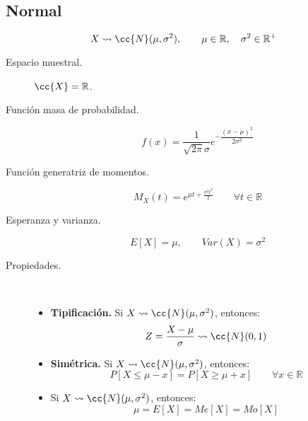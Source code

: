\subsection{Normal}
\begin{equation*}
    X\rightsquigarrow\cc{N}(\mu, \sigma^2), \qquad \mu\in \mathbb{R}, \quad \sigma^2 \in \mathbb{R}^+
\end{equation*}
\begin{description}
    \item [Espacio muestral.] $\cc{X}=\mathbb{R}$.
    \item [Función masa de probabilidad.] 
        \begin{equation*}
            f(x) = \dfrac{1}{\sqrt{2\pi}\sigma} e^{-\dfrac{{(x-\mu)}^{2}}{2\sigma^2}}
        \end{equation*}
    \item [Función generatriz de momentos.] 
        \begin{equation*}
            M_X(t) = e^{\mu t + \frac{\sigma^2t^2}{2}}\qquad \forall t\in \mathbb{R}
        \end{equation*}
    \item [Esperanza y varianza.] 
        \begin{equation*}
            E[X] = \mu, \qquad Var(X) = \sigma^2
        \end{equation*}
    \item [Propiedades.] \ \\
        \begin{itemize}
            \item \textbf{Tipificación.} Si $X\rightsquigarrow \cc{N}(\mu, \sigma^2)$, entonces:
                \begin{equation*}
                    Z = \dfrac{X-\mu}{\sigma}\rightsquigarrow\cc{N}(0,1)
                \end{equation*}
            \item \textbf{Simétrica.} Si $X\rightsquigarrow\cc{N}(\mu, \sigma^2)$, entonces:
                \begin{equation*}
                    P[X\leq \mu - x] = P[X\geq \mu + x] \qquad \forall x\in \mathbb{R}
                \end{equation*}
            \item Si $X\rightsquigarrow\cc{N}(\mu,\sigma^2)$, entonces:
                \begin{equation*}
                    \mu = E[X] = Me[X] = Mo[X]
                \end{equation*}
        \end{itemize}
\end{description}

